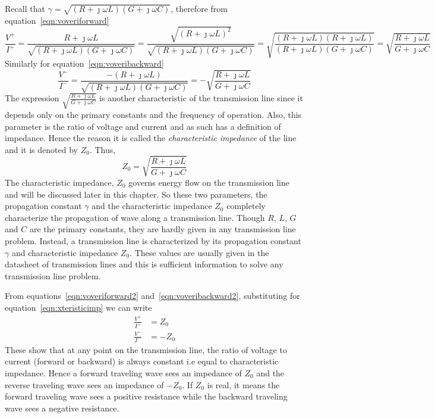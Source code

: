 Recall that $\gamma = \sqrt{(R + \jmath\omega L)(G + \jmath\omega C)}$, therefore from equation~\eqref{eqn:voveriforward}
\begin{dmath}
\frac{V^+}{I^+} = \frac{R+\jmath\omega L}{\sqrt{(R + \jmath\omega L)(G + \jmath\omega C)}}
= \frac{\sqrt{(R+\jmath\omega L)^2}}{\sqrt{(R + \jmath\omega L)(G + \jmath\omega C)}}
=\sqrt{\frac{(R+\jmath\omega L)(R+\jmath\omega L)}{(R + \jmath\omega L)(G + \jmath\omega C)}}
=\sqrt{\frac{R+\jmath\omega L}{G+\jmath\omega C}}
\label{eqn:voveriforward2}
\end{dmath}
Similarly for equation~\eqref{eqn:voveribackward}
\begin{dmath}
\frac{V^-}{I^-} = \frac{-(R+\jmath\omega L)}{\sqrt{(R + \jmath\omega L)(G + \jmath\omega C)}}
=-\sqrt{\frac{R+\jmath\omega L}{G+\jmath\omega C}}
\label{eqn:voveribackward2}
\end{dmath}
The expression $\sqrt{\frac{R+\jmath\omega L}{G+\jmath\omega C}}$ is another characteristic of the transmission line since it depends only on the primary constants and the frequency of operation. Also, this parameter is the ratio of voltage and current and as such has a definition of impedance. Hence the reason it is called the \emph{characteristic impedance} of the line and it is denoted by $Z_0$. Thus,
\begin{equation}
Z_0 = \sqrt{\frac{R+\jmath\omega L}{G+\jmath\omega C}}
\label{eqn:xteristicimp}
\end{equation}
The characteristic impedance, $Z_0$ governs energy flow on the transmission line and will be discussed later in this chapter. So these two parameters, the propagation constant $\gamma$ and the characteristic impedance $Z_0$ completely characterize the propagation of wave along a transmission line. Though $R$, $L$, $G$ and $C$ are the primary constants, they are hardly given in any transmission line problem. Instead, a transmission line is characterized by its propagation constant $\gamma$ and characteristic impedance $Z_0$. These values are usually given in the datasheet of transmission lines and this is sufficient information to solve any transmission line problem.

From equations~\eqref{eqn:voveriforward2} and~\eqref{eqn:voveribackward2}, substituting for equation~\eqref{eqn:xteristicimp} we can write
\begin{align}
\frac{V^+}{I^+} &= Z_0\\
\frac{V^-}{I^-} &= -Z_0
\end{align}
These show that at any point on the transmission line, the ratio of voltage to current (forward or backward) is always constant i.e equal to characteristic impedance. Hence a forward traveling wave sees an impedance of $Z_0$ and the reverse traveling wave sees an impedance of $-Z_0$. If $Z_0$ is real, it means the forward traveling wave sees a positive resistance while the backward traveling wave sees a negative resistance.

